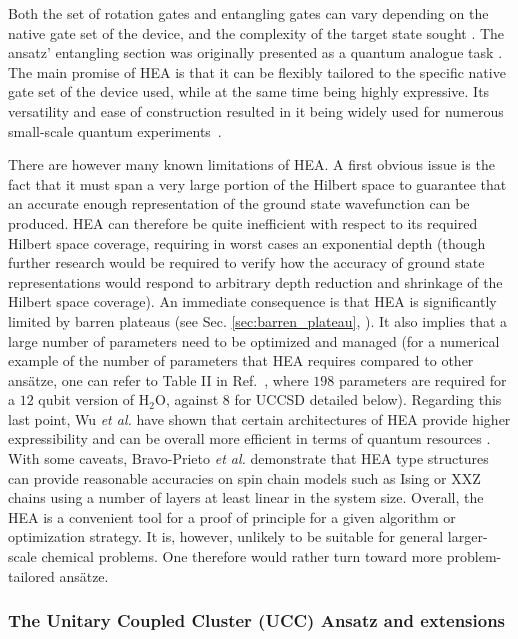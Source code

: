 Both the set of rotation gates and entangling gates can vary depending on the native gate set of the device, and the complexity of the target state sought \cite{Mitarai2019}. The ansatz' entangling section was originally presented as a quantum analogue task \cite{Kandala2017}. The main promise of HEA is that it can be flexibly tailored to the specific native gate set of the device used, while at the same time being highly expressive. Its versatility and ease of construction resulted in it being widely used for numerous small-scale quantum experiments~\cite{Kandala2017, Mitarai2019, higgottVariationalQuantumComputation2019, Tilly2020, Tilly2021, Chen2021}.

There are however many known limitations of HEA. A first obvious issue is the fact that it must span a very large portion of the Hilbert space to guarantee that an accurate enough representation of the ground state wavefunction can be produced. HEA can therefore be quite inefficient with respect to its required Hilbert space coverage, requiring in worst cases an exponential depth (though further research would be required to verify how the accuracy of ground state representations would respond to arbitrary depth reduction and shrinkage of the Hilbert space coverage). An immediate consequence is that HEA is significantly limited by barren plateaus \cite{Holmes2021} (see Sec. \ref{sec:barren_plateau}, \cite{McClean2018}). It also implies that a large number of parameters need to be optimized and managed (for a numerical example of the number of parameters that HEA requires compared to other ans{\"{a}}tze, one can refer to Table II in Ref.~\cite{Choquette2021}, where $198$ parameters are required for a $12$ qubit version of $\mathrm{H_2O}$, against $8$ for UCCSD detailed below). Regarding this last point, Wu \textit{et al.} have shown that certain architectures of HEA provide higher expressibility and can be overall more efficient in terms of quantum resources \cite{Wu2021_hea}.
With some caveats, Bravo-Prieto \textit{et al.} \cite{BravoPrieto2020} demonstrate that HEA type structures can provide reasonable accuracies on spin chain models such as Ising or XXZ chains using a number of layers at least linear in the system size. 
Overall, the HEA is a convenient tool for a proof of principle for a given algorithm or optimization strategy. It is, however, unlikely to be suitable for general larger-scale chemical problems. One therefore would rather turn toward more problem-tailored ans{\"{a}}tze.

\subsubsection{The Unitary Coupled Cluster (UCC) Ansatz and extensions}  \label{sec:UCCA}

